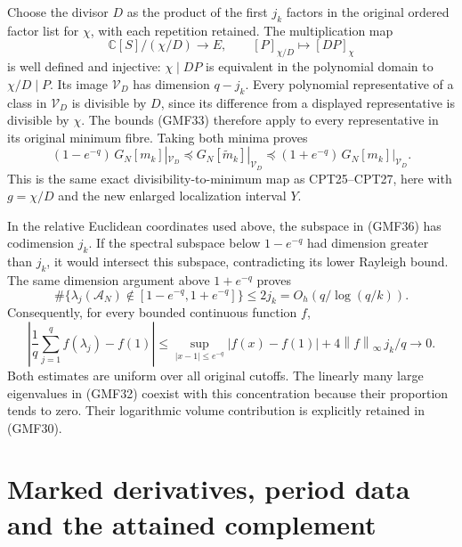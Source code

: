 \documentclass[11pt]{article}
\newcommand{\C}{\mathbb C}
\newcommand{\norm}[1]{\left\lVert#1\right\rVert}
\begin{document}
Choose the divisor \(D\) as the product of the first \(j_k\)
factors in the original ordered factor list for \(\chi\),
with each repetition retained.  The multiplication map
\begin{equation}\tag{GMF35}
 \C[S]/(\chi/D)\longrightarrow E,\qquad
 [P]_{\chi/D}\longmapsto[DP]_\chi
\end{equation}
is well defined and injective: \(\chi\mid DP\) is
equivalent in the polynomial domain to \(\chi/D\mid P\).
Its image \(\mathcal V_D\) has dimension \(q-j_k\).
Every polynomial representative of a class in \(\mathcal V_D\)
is divisible by \(D\), since its difference from a displayed
representative is divisible by \(\chi\).
The bounds (GMF33) therefore apply to every representative
in its original minimum fibre.  Taking both minima proves
\begin{equation}\tag{GMF36}
 (1-e^{-q})\,G_N[m_k]|_{\mathcal V_D}
 \preceq G_N[\widetilde m_k]|_{\mathcal V_D}
 \preceq(1+e^{-q})\,G_N[m_k]|_{\mathcal V_D}.
\end{equation}
This is the same exact divisibility-to-minimum map as
CPT25--CPT27, here with \(g=\chi/D\) and the new enlarged
localization interval \(Y\).

In the relative Euclidean coordinates used above, the
subspace in (GMF36) has codimension \(j_k\).
If the spectral subspace below \(1-e^{-q}\) had dimension
greater than \(j_k\), it would intersect this subspace,
contradicting its lower Rayleigh bound.
The same dimension argument above \(1+e^{-q}\) proves
\begin{equation}\tag{GMF37}
 \boxed{
 \#\{\lambda_j(\mathcal A_N)\notin
          [1-e^{-q},1+e^{-q}]\}
 \le2j_k=O_h(q/\log(q/k)).}
\end{equation}
Consequently, for every bounded continuous function \(f\),
\[
 \left|\frac1q\sum_{j=1}^q f(\lambda_j)-f(1)\right|
 \le\sup_{|x-1|\le e^{-q}}|f(x)-f(1)|
                    +4\norm f_\infty\,j_k/q\longrightarrow0 .
\]
Both estimates are uniform over all original cutoffs.
The linearly many large eigenvalues in (GMF32) coexist
with this concentration because their proportion tends
to zero.  Their logarithmic volume contribution is
explicitly retained in (GMF30).

\section{Marked derivatives, period data and the attained complement}
\end{document}
